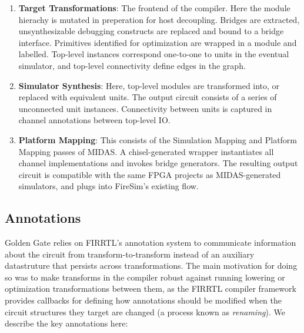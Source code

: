 \begin{enumerate}

\item \textbf{Target Transformations}: The frontend of the compiler. Here the
module hierachy is mutated in preperation for host decoupling. Bridges are
extracted, unsynthesizable debugging constructs are replaced and bound to a
bridge interface. Primitives identified for optimization are wrapped in a
module and labelled. Top-level instances correspond one-to-one to units in the
eventual simulator, and top-level connectivity define edges in the graph.

\item \textbf{Simulator Synthesis}: Here, top-level modules are transformed
into, or replaced with equivalent units. The output circuit consists of a
series of unconnected unit instances. Connectivity between units is captured in
channel annotations between top-level IO.

\item \textbf{Platform Mapping}: This consists of the Simulation Mapping and
Platform Mapping passes of MIDAS. A chisel-generated wrapper instantiates all
channel implementations and invokes bridge generators. The resulting output
circuit is compatible with the same FPGA projects as MIDAS-generated
simulators, and plugs into FireSim's existing flow.
\end{enumerate}

\subsection{Annotations}
Golden Gate relies on FIRRTL's annotation system to communicate information about the
circuit from transform-to-transform instead of an auxiliary
datastruture that persists across transformations. The main motivation for doing so was to make transforms in the
compiler robust against running lowering or optimization transformations
between them, as the FIRRTL compiler framework provides callbacks for defining
how annotations should be modified when the circuit structures they target are
changed (a process known as \emph{renaming}). We describe the key annotations here:

